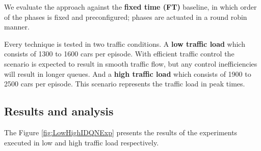 \documentclass{llncs}
\begin{document}
We evaluate the approach against the \textbf{fixed time (FT)} baseline, in which order of the phases is fixed and preconfigured; phases are actuated in a round robin manner. 

Every technique is tested in two traffic conditions. A \textbf{low traffic load} which consists of 1300 to 1600 cars per episode. With efficient traffic control the scenario is expected to result in smooth traffic flow, but any control inefficiencies will result in longer queues. And a \textbf{high traffic load} which consists of 1900 to 2500 cars per episode.  This scenario represents the traffic load in peak times.  

\subsection{Results and analysis} 

The Figure \ref{fig:LowHighIDQNExp} presents the results of the experiments executed in low and high traffic load respectively.
\end{document}
